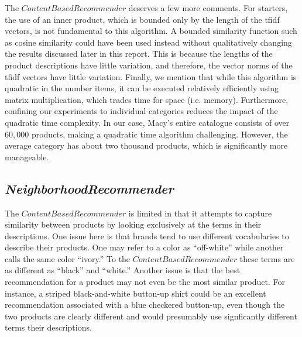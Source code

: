 \documentclass[11pt]{article}
\begin{document}
The $ContentBasedRecommender$ deserves a few more comments. For starters, the
use of an inner product, which is bounded only by the length of the tfidf
vectors, is not fundamental to this algorithm. A bounded similarity function
such as cosine similarity could have been used instead without qualitatively
changing the results discussed later in this report. This is because the lengths
of the product descriptions have little variation, and therefore, the vector
norms of the tfidf vectors have little variation. Finally, we mention that while
this algorithm is quadratic in the number items, it can be executed relatively
efficiently using matrix multiplication, which trades time for space (i.e.
memory). Furthermore, confining our experiments to individual categories reduces
the impact of the quadratic time complexity. In our case, Macy's entire
catalogue consists of over $60,000$ products, making a quadratic time algorithm
challenging. However, the average category has about two thousand products,
which is significantly more manageable.

\subsection*{\em NeighborhoodRecommender}
The $ContentBasedRecommender$ is limited in that it attempts to capture
similarity between products by looking exclusively at the terms in their
descriptions. One issue here is that brands tend to use different vocabularies
to describe their products. One may refer to a color as ``off-white'' while
another calls the same color ``ivory.'' To the $ContentBasedRecommender$ these
terms are as different as ``black'' and ``white.'' Another issue is that the
best recommendation for a product may not even be the most similar product. For
instance, a striped black-and-white button-up shirt could be an excellent
recommendation associated with a blue checkered button-up, even though the two
products are clearly different and would presumably use signficantly different
terms their descriptions.
\end{document}
